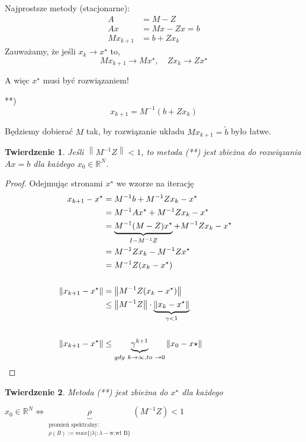 \documentclass[hidelinks,a4paper,fleqn,oneside]{book}
\newcommand{\RR}{\mathbb{R}}
\newcommand{\ra}{\rightarrow}
\newcommand{\eye}{I}
\newcommand{\norm}[1]{\left\lVert#1\right\rVert}
\newtheorem{twierdz}{Twierdzenie}
\begin{document}
Najprostsze metody (stacjonarne):
\begin{align*}
	A & = M - Z \\
	Ax & = Mx - Zx = b\\
	Mx_{k+1} & = b + Zx_k 
\end{align*}
Zauważamy, że jeśli $x_k \ra x^\star$ to,
\[
	Mx_{k+1} \ra Mx^\star,\quad Zx_k \ra Zx^\star
\]

A więc $x^\star$ musi być rozwiązaniem!

**)
\[
	x_{k+1} = M^{-1}(b + Zx_k)
\]

Będziemy dobierać $M$ tak, by rozwiązanie układu $Mx_{k+1} = \tilde{b}$ było łatwe.

\begin{twierdz}
	Jeśli $\norm{M^{-1}Z} < 1$, to metoda (**) jest zbieżna do rozwiązania $Ax = b$ dla każdego $x_0 \in \RR^N$.
\end{twierdz}


\begin{proof}
  Odejmując stronami $x^\star$ we wzorze na iterację
  \begin{align*}
	x_{k+1} - x^\star & = M^{-1}b + M^{-1}Zx_k - x^\star \\
		& = M^{-1}Ax^\star + M^{-1}Zx_k - x^\star \\
		& = \underbrace{M^{-1}(M-Z)x^\star}_{\eye - M^{-1}Z} + M^{-1}Zx_k - x^\star \\
		& = M^{-1}Zx_k - M^{-1}Zx^\star\\
		& = M^{-1}Z(x_k - x^\star) \\ \\
		\norm{x_{k+1} - x^\star} & = \norm{M^{-1}Z(x_k - x^\star)} \\
		& \leq \norm{M^{-1}Z} \cdot \underbrace{\norm{x_k - x^\star}}_{\gamma < 1} \\ \\
		\norm{x_{k+1} - x^\star} & \leq \underbrace{\gamma^{k+1}}_{gdy\ k \ra \infty, to\ \ra 0} \norm{x_0 - x\star}
		 && \qedhere
  \end{align*}
\end{proof}
	
\begin{twierdz}
	Metoda (**) jest zbieżna do $x^\star$ dla każdego

    $x_0 \in \RR^N \iff \underbrace{\rho}_{\substack{\textrm{promień spektralny: }\\ \rho(B) := max\{| \lambda|: \lambda - \textrm{w.wł B}\}}}(M^{-1}Z) < 1$
\end{twierdz}
\end{document}
